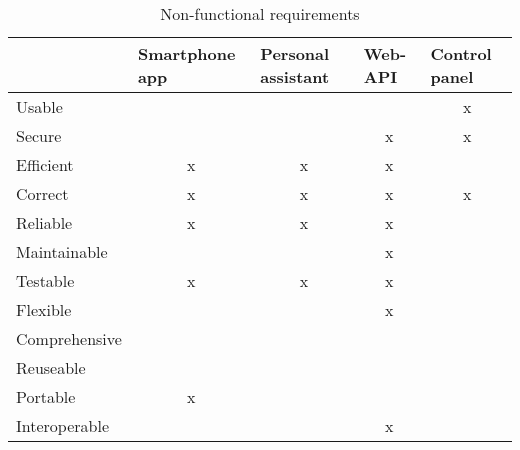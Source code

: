 \begin{table}[H]
\centering
\begin{tabular}{|l|c|c|c|c|}
\hline
              & \multicolumn{1}{l|}{Smartphone app} & \multicolumn{1}{l|}{Personal assistant} & \multicolumn{1}{l|}{Web-API} & \multicolumn{1}{l|}{Control panel} \\ \hline
Usable        &                                     &                                  &                              & x                                  \\ \hline
Secure        &                                     &                                  & x                            & x                                  \\ \hline
Efficient     & x                                   & x                                & x                            &                                    \\ \hline
Correct       & x                                   & x                                & x                            & x                                  \\ \hline
Reliable      & x                                   & x                                & x                            &                                    \\ \hline
Maintainable  &                                     &                                  & x                            &                                    \\ \hline
Testable      & x                                   & x                                & x                            &                                    \\ \hline
Flexible      &                                     &                                  & x                            &                                    \\ \hline
Comprehensive &                                     &                                  &                              &                                    \\ \hline
Reuseable     &                                     &                                  &                              &                                    \\ \hline
Portable      & x                                   &                                  &                              &                                    \\ \hline
Interoperable &                                     &                                  & x                            &                                    \\ \hline
\end{tabular}
\caption{Non-functional requirements}
\label{tab:non-functional}
\end{table}

